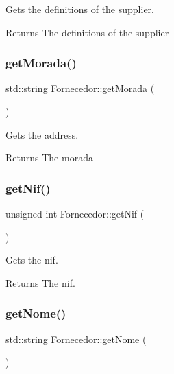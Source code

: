 Gets the definitions of the supplier. 

\begin{DoxyReturn}{Returns}
The definitions of the supplier 
\end{DoxyReturn}
\mbox{\label{classFornecedor_ae71fba3a196f749f54956fdbb25ede6a}} 
\subsubsection{\texorpdfstring{get\+Morada()}{getMorada()}}
{\footnotesize\ttfamily std\+::string Fornecedor\+::get\+Morada (\begin{DoxyParamCaption}{ }\end{DoxyParamCaption})\hspace{0.3cm}{\ttfamily [inline]}}



Gets the address. 

\begin{DoxyReturn}{Returns}
The morada 
\end{DoxyReturn}
\mbox{\label{classFornecedor_aec536b071f628fc1aa468071fa5a6067}} 
\subsubsection{\texorpdfstring{get\+Nif()}{getNif()}}
{\footnotesize\ttfamily unsigned int Fornecedor\+::get\+Nif (\begin{DoxyParamCaption}{ }\end{DoxyParamCaption})\hspace{0.3cm}{\ttfamily [inline]}}



Gets the nif. 

\begin{DoxyReturn}{Returns}
The nif. 
\end{DoxyReturn}
\mbox{\label{classFornecedor_a8d14dd862259e29adef0e283f15cbb16}} 
\subsubsection{\texorpdfstring{get\+Nome()}{getNome()}}
{\footnotesize\ttfamily std\+::string Fornecedor\+::get\+Nome (\begin{DoxyParamCaption}{ }\end{DoxyParamCaption})\hspace{0.3cm}{\ttfamily [inline]}}



